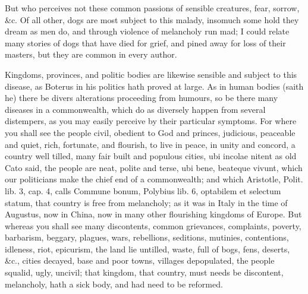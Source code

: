 {But who perceives not these common passions of sensible creatures,
fear, sorrow, \&c. Of all other, dogs are most subject to this malady,
insomuch some hold they dream as men do, and through violence of
melancholy run mad; I could relate many stories of dogs that have died
for grief, and pined away for loss of their masters, but they are
common in every author.

Kingdoms, provinces, and politic bodies are likewise sensible and
subject to this disease, as Boterus in his politics hath proved at
large. As in human bodies (saith he) there be divers alterations
proceeding from humours, so be there many diseases in a commonwealth,
which do as diversely happen from several distempers, as you may easily
perceive by their particular symptoms. For where you shall see the
people civil, obedient to God and princes, judicious, peaceable and
quiet, rich, fortunate, and flourish, to live in peace, in unity
and concord, a country well tilled, many fair built and populous
cities, ubi incolae nitent as old Cato said, the people are neat,
polite and terse, ubi bene, beateque vivunt, which our politicians make
the chief end of a commonwealth; and which  Aristotle, Polit. lib.
3, cap. 4, calls Commune bonum, Polybius lib. 6, optabilem et selectum
statum, that country is free from melancholy; as it was in Italy in the
time of Augustus, now in China, now in many other flourishing kingdoms
of Europe. But whereas you shall see many discontents, common
grievances, complaints, poverty, barbarism, beggary, plagues, wars,
rebellions, seditions, mutinies, contentions, idleness, riot,
epicurism, the land lie untilled, waste, full of bogs, fens, deserts,
\&c., cities decayed, base and poor towns, villages depopulated, the
people squalid, ugly, uncivil; that kingdom, that country, must needs
be discontent, melancholy, hath a sick body, and had need to be
reformed.

}
